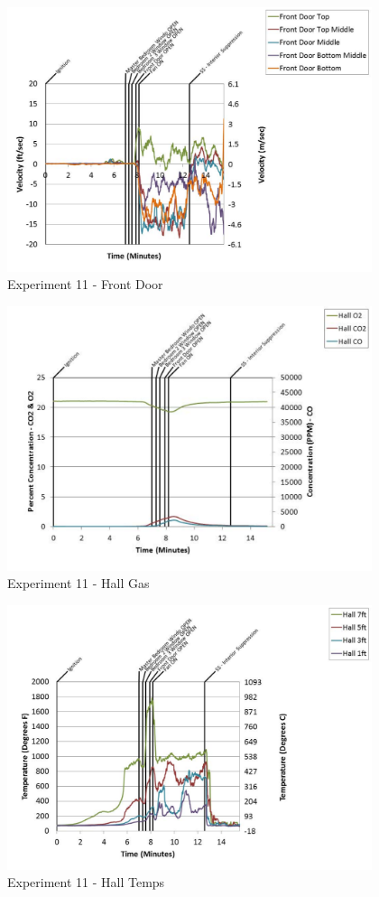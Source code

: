 \documentclass{article}
\begin{document}
\begin{appendices}
	\begin{figure}[h!]
		\centering
		\includegraphics[height=3.05in]{0_Images/Results_Charts/Exp_11_Charts/FrontDoor.pdf}
		\caption{Experiment 11 - Front Door}
	\end{figure}
 
	\clearpage

	\begin{figure}[h!]
		\centering
		\includegraphics[height=3.05in]{0_Images/Results_Charts/Exp_11_Charts/HallGas.pdf}
		\caption{Experiment 11 - Hall Gas}
	\end{figure}
 

	\begin{figure}[h!]
		\centering
		\includegraphics[height=3.05in]{0_Images/Results_Charts/Exp_11_Charts/HallTemps.pdf}
		\caption{Experiment 11 - Hall Temps}
	\end{figure}
 

\end{appendices}
\end{document}
